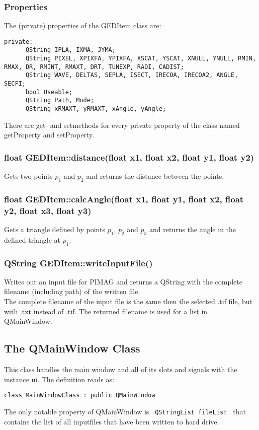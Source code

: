 \subsubsection{Properties} 
 The (private) properties of the GEDItem class are: 
\begin{lstlisting}
private: 
      QString IPLA, IXMA, JYMA;
      QString PIXEL, XPIXFA, YPIXFA, XSCAT, YSCAT, XNULL, YNULL, RMIN, RMAX, DR, RMINT, RMAXT, DRT, TUNEXP, RADI, CADIST;
      QString WAVE, DELTAS, SEPLA, ISECT, IRECOA, IRECOA2, ANGLE, SECFI;
      bool Useable;
      QString Path, Mode;
      QString xRMAXT, yRMAXT, xAngle, yAngle;
\end{lstlisting}
There are get- and setmethods for every private property of the class named getProperty and setProperty. 
\subsubsection{float GEDItem::distance(float x1, float x2, float y1, float y2)} 
Gets two points $p_1$ and $p_2$ and returns the distance between the points. 

\subsubsection{float GEDItem::calcAngle(float x1, float y1, float x2, float y2, float x3, float y3)}
Gets a triangle defined by points $p_1$, $p_2$ and $p_3$ and returns the angle in the defined triangle at $p_1$. 

\subsubsection{QString GEDItem::writeInputFile()}
Writes out an input file for PIMAG \cite{pimag} and returns a QString with the complete filename (including path) of the written file. \\
The complete filename of the input file is the same then the selected .tif file, but with .txt instead of .tif.  The returned filename is used for a list in QMainWindow. \\

\newpage

\subsection{The QMainWindow Class} 
This class handles the main window and all of its slots and signals with the instance ui. The definition reads as:
\begin{lstlisting}
class MainWindowClass : public QMainWindow
\end{lstlisting}
The only notable property of QMainWindow is \lstinline$ QStringList fileList $ that contains the list of all inputfiles that have been written to hard drive. 

